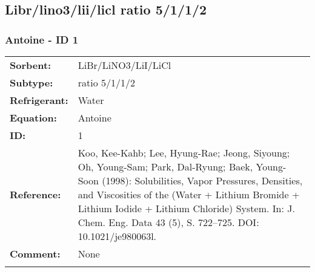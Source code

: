 \subsection{Libr/lino3/lii/licl ratio 5/1/1/2}
%
\subsubsection{Antoine - ID 1}
%
\begin{tabular}[l]{|lp{11.5cm}|}
\hline
\addlinespace

\textbf{Sorbent:} & LiBr/LiNO3/LiI/LiCl \\
\textbf{Subtype:} & ratio 5/1/1/2 \\
\textbf{Refrigerant:} & Water  \\
\textbf{Equation:} & Antoine \\
\textbf{ID:} & 1 \\
\textbf{Reference:} & Koo, Kee-Kahb; Lee, Hyung-Rae; Jeong, Siyoung; Oh, Young-Sam; Park, Dal-Ryung; Baek, Young-Soon (1998): Solubilities, Vapor Pressures, Densities, and Viscosities of the (Water + Lithium Bromide + Lithium Iodide + Lithium Chloride) System. In: J. Chem. Eng. Data 43 (5), S. 722–725. DOI: 10.1021/je980063l. \\
\textbf{Comment:} & None \\

\addlinespace
\hline
\end{tabular}
\newline

